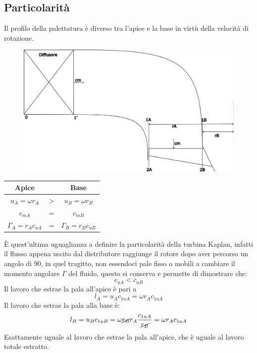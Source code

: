\documentclass[a4paper, 15pt]{article}
\begin{document}
\newpage

\subsection{Particolarità}
\begin{adjustwidth}{2in}{}
	Il profilo della palettatura è diverso tra l'apice e la base in virtù della velocità di rotazione. 
	
\begin{figure}[H]
	\centering
	\includegraphics[width=0.7\linewidth]{inkscape/Kaplan2.pdf}
	\label{fig:kaplan2}
\end{figure}

	\begin{center}
		\begin{tabular}{|c|c|c|}
		\hline
		       Apice         &   &         Base         \\ \hline
		  $u_A=\omega r_A$   & > &   $u_B=\omega r_B$   \\ \hline
		      $c_{mA}$       & = &       $c_{mB}$       \\ \hline
		$\Gamma_A=r_Ac_{uA}$ & = & $\Gamma_B=r_Bc_{uB}$ \\ \hline
	\end{tabular}
	\end{center}

\vspace{0.5cm}
	È quest'ultima uguaglianza a definire la particolarità della turbina Kaplan, infatti il flusso appena uscito dal distributore raggiunge il rotore dopo aver percorso un angolo di 90\degree, in quel tragitto, non essendoci pale fisso o mobili a cambiare il momento angolare $\Gamma$ del fluido, questo si conserva e permette di dimostrare che:
	\[c_{uA}<c_{uB}\]
	Il lavoro che estrae la pala all'apice è pari a
	\[l_A = u_Ac_{1uA} = \omega r_Ac_{1uA}\]
	Il lavoro che estrae la pala alla base è:
	\[l_B = u_Bc_{1uB} = \omega \cancel{r_B}r_A{c_{1uA}\over \cancel{r_B}} = \omega r_Ac_{1uA}\]
	Esattamente uguale al lavoro che estrae la pala all'apice, che è uguale al lavoro totale estratto. 
\end{adjustwidth}	
\end{document}
